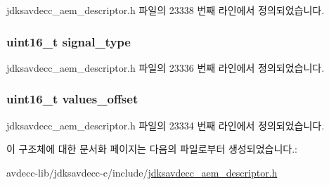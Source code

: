 jdksavdecc\+\_\+aem\+\_\+descriptor.\+h 파일의 23338 번째 라인에서 정의되었습니다.

\subsubsection[{\texorpdfstring{signal\+\_\+type}{signal_type}}]{\setlength{\rightskip}{0pt plus 5cm}uint16\+\_\+t signal\+\_\+type}\hypertarget{structjdksavdecc__descriptor__signal__transcoder_a248e60ef99d5ed1779989d1dd6b6dc5a}{}\label{structjdksavdecc__descriptor__signal__transcoder_a248e60ef99d5ed1779989d1dd6b6dc5a}


jdksavdecc\+\_\+aem\+\_\+descriptor.\+h 파일의 23336 번째 라인에서 정의되었습니다.

\subsubsection[{\texorpdfstring{values\+\_\+offset}{values_offset}}]{\setlength{\rightskip}{0pt plus 5cm}uint16\+\_\+t values\+\_\+offset}\hypertarget{structjdksavdecc__descriptor__signal__transcoder_a2987071ee0b81f35817e48a0dc92ad76}{}\label{structjdksavdecc__descriptor__signal__transcoder_a2987071ee0b81f35817e48a0dc92ad76}


jdksavdecc\+\_\+aem\+\_\+descriptor.\+h 파일의 23334 번째 라인에서 정의되었습니다.



이 구조체에 대한 문서화 페이지는 다음의 파일로부터 생성되었습니다.\+:\begin{DoxyCompactItemize}
\item 
avdecc-\/lib/jdksavdecc-\/c/include/\hyperlink{jdksavdecc__aem__descriptor_8h}{jdksavdecc\+\_\+aem\+\_\+descriptor.\+h}\end{DoxyCompactItemize}
